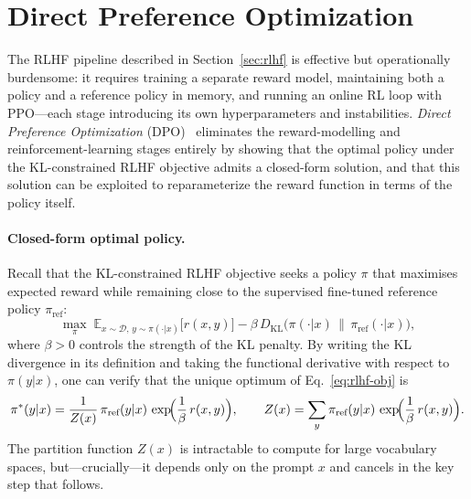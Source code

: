 \section{Direct Preference Optimization}
\label{sec:dpo}

The RLHF pipeline described in Section~\ref{sec:rlhf} is effective but
operationally burdensome: it requires training a separate reward model,
maintaining both a policy and a reference policy in memory, and running an
online RL loop with PPO---each stage introducing its own hyperparameters and
instabilities.  \emph{Direct Preference Optimization}
(DPO)~\cite{rafailov2023dpo} eliminates the reward-modelling and
reinforcement-learning stages entirely by showing that the optimal policy under
the KL-constrained RLHF objective admits a closed-form solution, and that this
solution can be exploited to reparameterize the reward function in terms of the
policy itself.

\paragraph{Closed-form optimal policy.}
Recall that the KL-constrained RLHF objective seeks a policy $\pi$ that
maximises expected reward while remaining close to the supervised fine-tuned
reference policy $\pi_{\text{ref}}$:
\begin{equation}
\label{eq:rlhf-obj}
\max_{\pi}\;\mathbb{E}_{x \sim \mathcal{D},\, y \sim \pi(\cdot|x)}
  \bigl[r(x,y)\bigr]
  - \beta\, D_{\mathrm{KL}}\!\bigl(\pi(\cdot|x) \,\|\, \pi_{\text{ref}}(\cdot|x)\bigr),
\end{equation}
where $\beta > 0$ controls the strength of the KL penalty.  By writing the KL
divergence in its definition and taking the functional derivative with respect
to $\pi(y|x)$, one can verify that the unique optimum of
Eq.~\eqref{eq:rlhf-obj} is
\begin{equation}
\label{eq:optimal-policy}
\pi^{*}(y|x)
  = \frac{1}{Z(x)}\,\pi_{\text{ref}}(y|x)\,
    \exp\!\Bigl(\frac{1}{\beta}\,r(x,y)\Bigr),
\qquad
Z(x) = \sum_{y} \pi_{\text{ref}}(y|x)\,
       \exp\!\Bigl(\frac{1}{\beta}\,r(x,y)\Bigr).
\end{equation}
The partition function $Z(x)$ is intractable to compute for large vocabulary
spaces, but---crucially---it depends only on the prompt $x$ and cancels in the
key step that follows.

